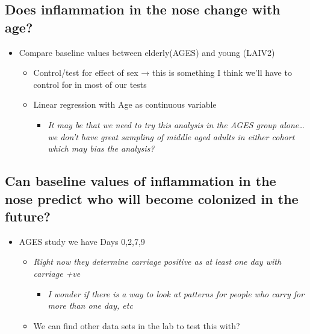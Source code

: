 \documentclass[
]{book}
\providecommand{\tightlist}{%
  \setlength{\itemsep}{0pt}\setlength{\parskip}{0pt}}
\begin{document}
\hypertarget{does-inflammation-in-the-nose-change-with-age}{%
\subsection{Does inflammation in the nose change with age?}\label{does-inflammation-in-the-nose-change-with-age}}

\begin{itemize}
\item
  Compare baseline values between elderly(AGES) and young (LAIV2)

  \begin{itemize}
  \item
    Control/test for effect of sex → this is something I think we'll have to control for in most of our tests
  \item
    Linear regression with Age as continuous variable

    \begin{itemize}
    \tightlist
    \item
      \emph{It may be that we need to try this analysis in the AGES group alone\ldots we don't have great sampling of middle aged adults in either cohort which may bias the analysis?}
    \end{itemize}
  \end{itemize}
\end{itemize}

\hypertarget{can-baseline-values-of-inflammation-in-the-nose-predict-who-will-become-colonized-in-the-future}{%
\subsection{Can baseline values of inflammation in the nose predict who will become colonized in the future?}\label{can-baseline-values-of-inflammation-in-the-nose-predict-who-will-become-colonized-in-the-future}}

\begin{itemize}
\item
  AGES study we have Days 0,2,7,9

  \begin{itemize}
  \item
    \emph{Right now they determine carriage positive as at least one day with carriage +ve}

    \begin{itemize}
    \tightlist
    \item
      \emph{I wonder if there is a way to look at patterns for people who carry for more than one day, etc}
    \end{itemize}
  \item
    We can find other data sets in the lab to test this with?
  \end{itemize}
\end{itemize}
\end{document}
